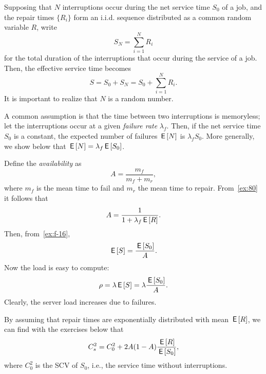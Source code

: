Supposing that $N$ interruptions occur during the net service time $S_0$ of a job, and the repair times $\{R_i\}$ form an i.i.d.
sequence distributed as a common random variable $R$, write
\begin{equation}\label{eq:104}
S_N = \sum_{i=1}^N R_i
\end{equation}
for the total duration of the interruptions that occur during the service of a job. Then,  the  effective service time becomes
\begin{equation*}
  S= S_0 + S_N = S_0 + \sum_{i=1}^N R_i. 
\end{equation*}
It is important to realize that $N$ is a random number. 


A common assumption is that the time between two interruptions is memoryless; let the interruptions occur at a given \emph{failure rate} $\lambda_f$.
Then, if the net service time $S_0$ is a constant, the expected number of failures $\,\mathsf{E}\left[N\right]$ is $\lambda_f S_0$.
More generally, we show below that $\,\mathsf{E}\left[N\right] =\lambda_f \,\mathsf{E}\left[S_0\right]$.


Define the \emph{availability} as
\begin{equation*}
 A=\frac{m_f}{m_f + m_r},
\end{equation*}
where $m_f$ is the mean time to fail and $m_r$ the mean time to repair.  From~\cref{ex:80} it follows that
\begin{equation}\label{eq:91}
A=\frac 1{1+\lambda_f \,\mathsf{E}\left[R\right]}.
\end{equation}
Then, from~\cref{ex:f-16}, 
\begin{equation}\label{eq:83}
 \,\mathsf{E}\left[S\right] = \frac{\,\mathsf{E}\left[S_0\right]}{A}. 
\end{equation}
Now  the load is easy to compute: 
\begin{equation*}
\rho = \lambda \,\mathsf{E}\left[S\right] = \lambda \frac{\,\mathsf{E}\left[S_0\right]}A.
\end{equation*}
Clearly, the server load increases due to failures. 


By assuming that repair times are exponentially distributed with mean $\,\mathsf{E}\left[R\right]$, we can find with the exercises below  that 
\begin{equation}\label{eq:87}
 C_s^2 = C_0^2 + 2 A(1-A) \frac{\,\mathsf{E}\left[R\right]}{\,\mathsf{E}\left[S_0\right]},
\end{equation}
where $C_0^2$ is the SCV of $S_0$, i.e., the service time without interruptions. 


